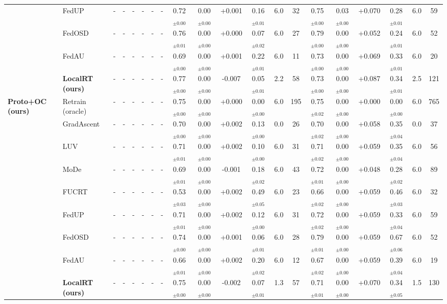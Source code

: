 \begin{table}[t]
\begin{tabular}{ll|cccccc|cccccc|cccccc}
 & FedUP & - & - & - & - & - & - & 0.72$_{\pm0.00}$ & 0.00$_{\pm0.00}$ & +0.001 & 0.16$_{\pm0.01}$ & 6.0 & 32 & 0.75$_{\pm0.00}$ & 0.03$_{\pm0.00}$ & +0.070 & 0.28$_{\pm0.01}$ & 6.0 & 59\\
 & FedOSD & - & - & - & - & - & - & 0.76$_{\pm0.01}$ & 0.00$_{\pm0.00}$ & +0.000 & 0.07$_{\pm0.02}$ & 6.0 & 27 & 0.79$_{\pm0.00}$ & 0.00$_{\pm0.00}$ & +0.052 & 0.24$_{\pm0.01}$ & 6.0 & 52\\
 & FedAU & - & - & - & - & - & - & 0.69$_{\pm0.00}$ & 0.00$_{\pm0.00}$ & +0.001 & 0.22$_{\pm0.01}$ & 6.0 & 11 & 0.73$_{\pm0.00}$ & 0.00$_{\pm0.00}$ & +0.069 & 0.33$_{\pm0.01}$ & 6.0 & 20\\
 & \textbf{LocalRT (ours)} & - & - & - & - & - & - & 0.77$_{\pm0.00}$ & 0.00$_{\pm0.00}$ & -0.007 & 0.05$_{\pm0.01}$ & 2.2 & 58 & 0.73$_{\pm0.00}$ & 0.00$_{\pm0.00}$ & +0.087 & 0.34$_{\pm0.01}$ & 2.5 & 121\\
\midrule
\textbf{Proto+OC (ours)} & Retrain (oracle) & - & - & - & - & - & - & 0.75$_{\pm0.00}$ & 0.00$_{\pm0.00}$ & +0.000 & 0.00$_{\pm0.00}$ & 6.0 & 195 & 0.75$_{\pm0.02}$ & 0.00$_{\pm0.00}$ & +0.000 & 0.00$_{\pm0.00}$ & 6.0 & 765\\
 & GradAscent & - & - & - & - & - & - & 0.70$_{\pm0.00}$ & 0.00$_{\pm0.00}$ & +0.002 & 0.13$_{\pm0.00}$ & 0.0 & 26 & 0.70$_{\pm0.02}$ & 0.00$_{\pm0.00}$ & +0.058 & 0.35$_{\pm0.04}$ & 0.0 & 37\\
 & LUV & - & - & - & - & - & - & 0.71$_{\pm0.01}$ & 0.00$_{\pm0.00}$ & +0.002 & 0.10$_{\pm0.00}$ & 6.0 & 31 & 0.71$_{\pm0.02}$ & 0.00$_{\pm0.00}$ & +0.059 & 0.35$_{\pm0.04}$ & 6.0 & 56\\
 & MoDe & - & - & - & - & - & - & 0.69$_{\pm0.01}$ & 0.00$_{\pm0.00}$ & -0.001 & 0.18$_{\pm0.02}$ & 6.0 & 43 & 0.72$_{\pm0.01}$ & 0.00$_{\pm0.00}$ & +0.048 & 0.28$_{\pm0.02}$ & 6.0 & 89\\
 & FUCRT & - & - & - & - & - & - & 0.53$_{\pm0.03}$ & 0.00$_{\pm0.00}$ & +0.002 & 0.49$_{\pm0.05}$ & 6.0 & 23 & 0.66$_{\pm0.02}$ & 0.00$_{\pm0.00}$ & +0.059 & 0.46$_{\pm0.03}$ & 6.0 & 32\\
 & FedUP & - & - & - & - & - & - & 0.71$_{\pm0.01}$ & 0.00$_{\pm0.00}$ & +0.002 & 0.12$_{\pm0.00}$ & 6.0 & 31 & 0.72$_{\pm0.02}$ & 0.00$_{\pm0.00}$ & +0.059 & 0.33$_{\pm0.04}$ & 6.0 & 59\\
 & FedOSD & - & - & - & - & - & - & 0.74$_{\pm0.00}$ & 0.00$_{\pm0.00}$ & +0.001 & 0.06$_{\pm0.01}$ & 6.0 & 28 & 0.79$_{\pm0.01}$ & 0.00$_{\pm0.00}$ & +0.059 & 0.67$_{\pm0.06}$ & 6.0 & 52\\
 & FedAU & - & - & - & - & - & - & 0.66$_{\pm0.01}$ & 0.00$_{\pm0.00}$ & +0.002 & 0.20$_{\pm0.02}$ & 6.0 & 12 & 0.67$_{\pm0.02}$ & 0.00$_{\pm0.00}$ & +0.059 & 0.39$_{\pm0.04}$ & 6.0 & 19\\
 & \textbf{LocalRT (ours)} & - & - & - & - & - & - & 0.75$_{\pm0.00}$ & 0.00$_{\pm0.00}$ & -0.002 & 0.07$_{\pm0.01}$ & 1.3 & 57 & 0.71$_{\pm0.01}$ & 0.00$_{\pm0.00}$ & +0.070 & 0.34$_{\pm0.05}$ & 1.5 & 130\\
\bottomrule\end{tabular}\end{table}
